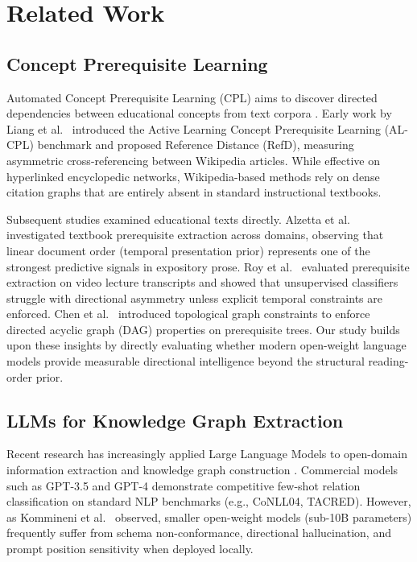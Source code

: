 \section{Related Work}
\label{sec:related_work}

\subsection{Concept Prerequisite Learning}
Automated Concept Prerequisite Learning (CPL) aims to discover directed dependencies between educational concepts from text corpora \cite{chen2018prereq}. Early work by Liang et al.~\cite{liang2015prereq} introduced the Active Learning Concept Prerequisite Learning (AL-CPL) benchmark and proposed Reference Distance (RefD), measuring asymmetric cross-referencing between Wikipedia articles. While effective on hyperlinked encyclopedic networks, Wikipedia-based methods rely on dense citation graphs that are entirely absent in standard instructional textbooks.

Subsequent studies examined educational texts directly. Alzetta et al.~\cite{alzetta2020prereq,alzetta2021textbooks} investigated textbook prerequisite extraction across domains, observing that linear document order (temporal presentation prior) represents one of the strongest predictive signals in expository prose. Roy et al.~\cite{roy2019moocs} evaluated prerequisite extraction on video lecture transcripts and showed that unsupervised classifiers struggle with directional asymmetry unless explicit temporal constraints are enforced. Chen et al.~\cite{chen2018prereq} introduced topological graph constraints to enforce directed acyclic graph (DAG) properties on prerequisite trees. Our study builds upon these insights by directly evaluating whether modern open-weight language models provide measurable directional intelligence beyond the structural reading-order prior.

\subsection{LLMs for Knowledge Graph Extraction}
Recent research has increasingly applied Large Language Models to open-domain information extraction and knowledge graph construction \cite{carta2023iterative,trajanoska2023llm}. Commercial models such as GPT-3.5 and GPT-4 demonstrate competitive few-shot relation classification on standard NLP benchmarks (e.g., CoNLL04, TACRED). However, as Kommineni et al.~\cite{kommineni2024llm} observed, smaller open-weight models (sub-10B parameters) frequently suffer from schema non-conformance, directional hallucination, and prompt position sensitivity when deployed locally. 

